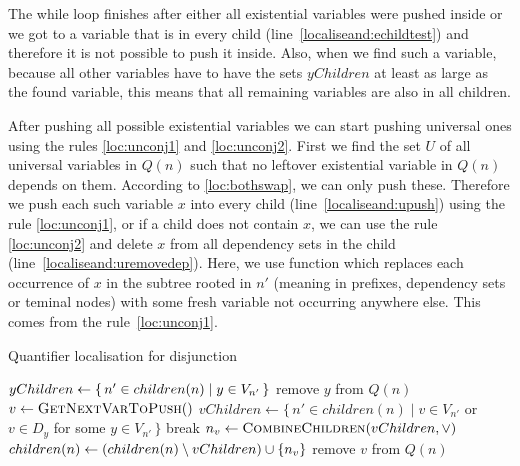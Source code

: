 \documentclass[
  digital, %
  color,
  twoside, %
  table,   %
  nolof,     %
  nolot,     %
]{fithesis3}
\let\setbuilder\set
\newcommand{\simpleset}[1]{\{{#1}\}}
\renewcommand{\set}[1]{\normalexpandarg\IfSubStr{#1}{|}{\setbuilder{#1}}{\simpleset{#1}}}
\theoremstyle{definition}
\theoremstyle{remark}
\newcommand{\vars}[1]{V_{#1}}
\newcommand{\prefix}[1]{Q({#1})}
\newcommand{\eprefix}[1]{Q_{\exists}(#1)}
\newcommand{\children}[1]{children({#1})}
\begin{document}
The while loop finishes after either all existential variables were pushed inside or we got to a variable that is in every child (line~\ref{localiseand:echildtest}) and therefore it is not possible to push it inside. Also, when we find such a variable, because all other variables have to have the sets $yChildren$ at least as large as the found variable, this means that all remaining variables are also in all children.

After pushing all possible existential variables we can start pushing universal ones using the rules \eqref{loc:unconj1} and \eqref{loc:unconj2}. First we find the set $U$ of all universal variables in $\prefix{n}$ such that no leftover existential variable in $\prefix{n}$ depends on them. According to \eqref{loc:bothswap}, we can only push these. Therefore we push each such variable $x$ into every child (line~\ref{localiseand:upush}) using the rule \eqref{loc:unconj1}, or if a child does not contain $x$, we can use the rule \eqref{loc:unconj2} and delete $x$ from all dependency sets in the child (line~\ref{localiseand:uremovedep}). Here, we use function  which replaces each occurrence of $x$ in the subtree rooted in $n'$ (meaning in prefixes, dependency sets or teminal nodes) with some fresh variable not occurring anywhere else. This comes from the rule~\eqref{loc:unconj1}.

\begin{algorithm}[t!]
  \caption{Quantifier localisation for disjunction}
  \label{alg:localiseor}
  \begin{algorithmic}[1]
      \ForAll{$y \in \eprefix{n}$}\label{localiseor:estart}
        \State $yChildren \gets \set{n' \in \children{n} | y \in \vars{n'}}$\label{localiseor:egetchildren}
        \label{localiseor:checkconditions}
            \State {}\label{localiseor:epush}
            \State {}
          \EndFor
          \State remove $y$ from $\prefix{n}$
        \EndIf
      \EndFor\label{localiseor:eend}
      \While{$\prefix{n}$ is not empty}\label{localiseor:bstart}
        \State $v \gets \Call{GetNextVarToPush}{\null}$\label{localiseor:getnextvar}
        \State $vChildren \gets \{\,n' \in \children{n} \mid v \in \vars{n'}$  or  $v \in D_y$ for\label{localiseor:bgetchildren}
        \Statex \hspace{9cm} some $y \in \vars{n'}\,\}$
        \If{$vChildren = \children{n}$}\label{localiseor:bcompare}
          \State break
        \Else
          \State $n_v \gets \Call{CombineChildren}{vChildren, {\lor}}$\label{localiseor:bcombine}
          \State $\children{n} \gets (\children{n} \setminus vChildren) \cup \set{n_v}$\label{localiseor:bupdatechildren}
          \State {}\label{localiseor:bpush}
          \State remove $v$ from $\prefix{n}$\label{localiseor:bremove}
        \EndIf
      \EndWhile\label{localiseor:bend}
    \EndFunction
  \end{algorithmic}
\end{algorithm}
\end{document}
